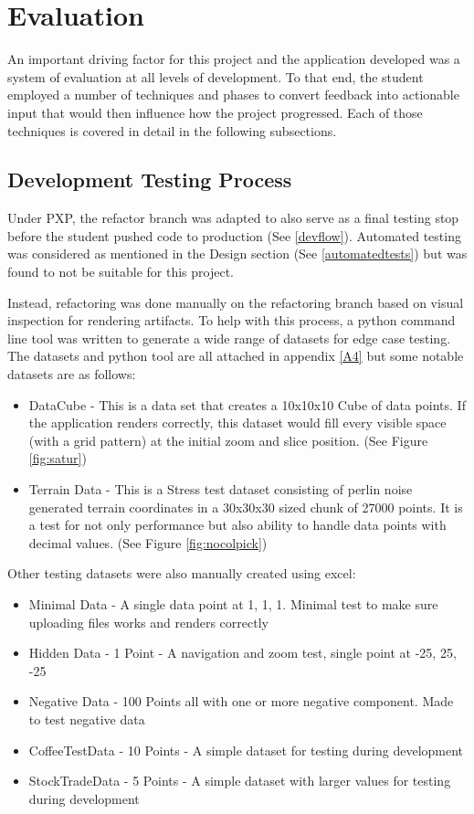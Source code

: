 \section{Evaluation}
An important driving factor for this project and the application developed was a system of evaluation at all levels of development. To that end, the student employed a
number of techniques and phases to convert feedback into actionable input that would then influence how the project progressed. Each of those techniques is covered in detail in the following subsections.

\subsection{Development Testing Process} \label{devtest}
Under PXP, the refactor branch was adapted to also serve as a final testing stop before the student pushed code to production (See \ref{devflow}). Automated testing was considered as mentioned in the Design section (See \ref{automatedtests}) but was found to not be suitable for this project.

Instead, refactoring was done manually on the refactoring branch based on visual inspection for rendering artifacts. To help with this process, a python command line tool was written to generate a wide range of datasets for edge case testing. The datasets and python tool are all attached in appendix \ref{A4} but some notable datasets are as follows:

\begin{itemize}
    \item DataCube - This is a data set that creates a 10x10x10 Cube of data points. If the application renders correctly, this dataset would fill every visible space (with a grid pattern) at the initial zoom and slice position. (See Figure \ref{fig:satur})
    \item Terrain Data - This is a Stress test dataset consisting of perlin noise generated terrain coordinates in a 30x30x30 sized chunk of 27000 points. It is a test for not only performance but also ability to handle data points with decimal values. (See Figure \ref{fig:nocolpick})
\end{itemize}

Other testing datasets were also manually created using excel:
\begin{itemize}
    \item Minimal Data - A single data point at 1, 1, 1. Minimal test to make sure uploading files works and renders correctly
    \item Hidden Data - 1 Point - A navigation and zoom test, single point at -25, 25, -25
    \item Negative Data - 100 Points all with one or more negative component. Made to test negative data
    \item CoffeeTestData - 10 Points - A simple dataset for testing during development
    \item StockTradeData - 5 Points - A simple dataset with larger values for testing during development
\end{itemize}

